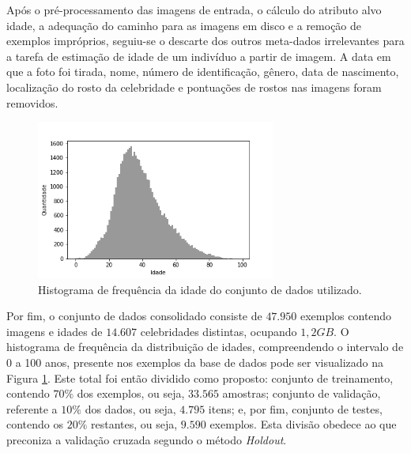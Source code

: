 Após o pré-processamento das imagens de entrada, o cálculo do atributo alvo idade, a adequação do caminho para as imagens em disco e a remoção de exemplos impróprios, seguiu-se o descarte dos outros meta-dados irrelevantes para a tarefa de estimação de idade de um indivíduo a partir de imagem. A data em que a foto foi tirada, nome, número de identificação, gênero, data de nascimento, localização do rosto da celebridade e pontuações de rostos nas imagens foram removidos.

\begin{figure}[!ht]
    \centering
     \includegraphics[width=0.7\textwidth]{img/idade_hist_clean}
     \caption{Histograma de frequência da idade do conjunto de dados utilizado.}
     \label{fig:hist}
\end{figure}

Por fim, o conjunto de dados consolidado consiste de $47.950$ exemplos contendo imagens e idades de $14.607$ celebridades distintas, ocupando $1,2 GB$. O histograma de frequência da distribuição de idades, compreendendo o intervalo de 0 a 100 anos, presente nos exemplos da base de dados pode ser visualizado na Figura \ref{fig:hist}. Este total foi então dividido como proposto: conjunto de treinamento, contendo $70\%$ dos exemplos, ou seja, $33.565$ amostras; conjunto de validação, referente a $10\%$ dos dados, ou seja, $4.795$ itens; e, por fim, conjunto de testes, contendo os $20\%$ restantes, ou seja, $9.590$ exemplos. Esta divisão obedece ao que preconiza a validação cruzada segundo o método \emph{Holdout}.
